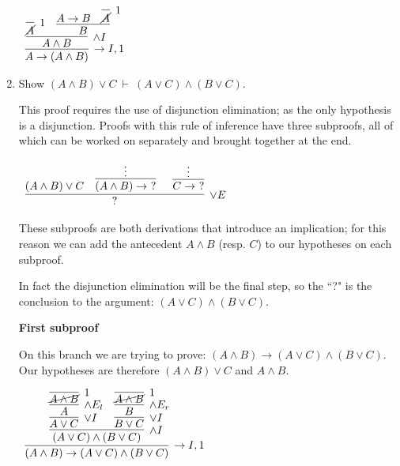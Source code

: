 \documentclass[11pt]{report}
\begin{document}
\begin{enumerate}
	\begin{mdframed}
		\begin{center}
			$\begin{array}{c}
				\infer[\to I,1]{A \to (A \land B)}
					{\infer[\land I]{A \land B}
					{\infer[1]{\cancel{A}}{} 				
					&				
					\infer[]{B}
						{A \to B 
						& 
						\infer[1]{\cancel{A}}{}}}}
			\end{array}$
		\end{center}
	\end{mdframed}
	
	\newpage
	\item Show $(A \land B) \lor C \ \vdash \ (A \lor C) \land (B \lor C)$.

	\hspace{0.2cm}{\bf Solution}

	This proof requires the use of disjunction elimination; as the only hypothesis is a disjunction. Proofs with this rule of inference have three subproofs, all of which can be worked on separately and brought together at the end. 

	\begin{center}
		$\begin{array}{c}
			\infer[\lor E]{?}{(A \land B) \lor C
							  &
							  \infer[]{(A \land B) \to \ ?}{\vdots}
							  &
							  \infer[]{C \to \ ?}{\vdots}}
		\end{array}$
	\end{center}

	These subproofs are both derivations that introduce an implication; for this reason we can add the antecedent $A \land B$ (resp. $C$) to our hypotheses on each subproof. 

	In fact the disjunction elimination will be the final step, so the ``?" is the conclusion to the argument: $(A \lor C) \land (B \lor C)$.

	\hspace{0.5cm} {\bf First subproof}

	On this branch we are trying to prove: $(A \land B) \to (A \lor C) \land (B \lor C)$. Our hypotheses are therefore $(A\land B) \lor C$ and $A \land B$.

	\begin{center}
		$\begin{array}{c}
			\infer[\to I,1]{(A \land B) \to (A \lor C) \land (B \lor C)}
				{\infer[\land I]{(A \lor C) \land (B \lor C)}
					{\infer[\lor I]{A \lor C}
						{\infer[\land E_{l}]{A}
							{\infer[1]{\cancel{A \land B}}{}}}
					&
					\infer[\lor I]{B \lor C}
						{\infer[\land E_{r}]{B}
							{\infer[1]{\cancel{A \land B}}{}}}}}
		\end{array}$
	\end{center}


\end{enumerate}
\end{document}
